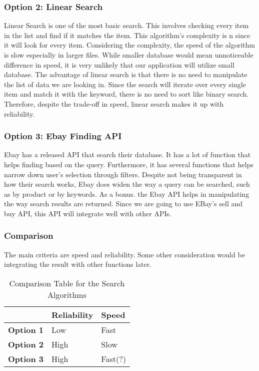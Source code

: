 \documentclass[journal,compsoc, 10pt, draftclsnofoot, onecolumn]{IEEEtran}
\begin{document}
\subsubsection*{Option 2: Linear Search}
Linear Search is one of the most basic search. This involves checking every item in the list and find if it matches the item. This algorithm's complexity is n since it will look for every item. Considering the complexity, the speed of the algorithm is slow especially in larger files. While smaller database would mean unnoticeable difference in speed, it is very unlikely that our application will utilize small database. The advantage of linear search is that there is no need to manipulate the list of data we are looking in. Since the search will iterate over every single item and match it with the keyword, there is no need to sort like binary search. Therefore, despite the trade-off in speed, linear search makes it up with reliability.

\subsubsection*{Option 3: Ebay Finding API}
Ebay has a released API that search their database. It has a lot of function that helps finding based on the query. Furthermore, it has several functions that helps narrow down user's selection through filters. Despite not being transparent in how their search works, Ebay does widen the way a query can be searched, such as by product or by keywords. As a bonus.  the Ebay API helps in manipulating the way search results are returned. Since we are going to use EBay's sell and buy API, this API will integrate well with other APIs.  

\subsubsection{Comparison}
The main criteria are speed and reliability. Some other consideration would be integrating the result with other functions later.

\begin{table}[h]
	\centering
	\caption{Comparison Table for the Search Algorithms}
	\label{Comparison Table for the Search Algorithm}
	\begin{tabularx}{\textwidth}{|X|X|X|}
		\hline
		\textbf{}         & \textbf{Reliability}                & \textbf{Speed} 
		\\ \hline
		\textbf{Option 1} & Low & Fast
		\\ \hline
		\textbf{Option 2} & High & Slow                                                                                       
		\\ \hline
		\textbf{Option 3} & High &Fast(?)                                                               
		\\ \hline
	\end{tabularx}
\end{table}
\end{document}
